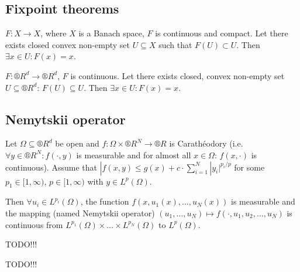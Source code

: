 \documentclass[12pt]{article}					%
\begin{document}
\subsection{Fixpoint theorems}
\begin{veta}
	$F: X \rightarrow X$, where $X$ is a Banach space, $F$ is continuous and compact. Let there exists closed convex non-empty set $U \subseteq X$ such that $F(U) \subset U$. Then $\exists x \in U: F(x) = x$.
\end{veta}

\begin{veta}
	$F: ®R^d \rightarrow ®R^d$, $F$ is continuous. Let there exists closed, convex non-empty set $U \subseteq ®R^d$: $F(U) \subseteq U$. Then $\exists x \in U: F(x) = x$.
\end{veta}

\subsection{Nemytskii operator}
\begin{veta}
	Let $Ω \subseteq ®R^d$ be open and $f: Ω \times ®R^N \rightarrow ®R$ is Carathéodory (i.e. $\forall y \in ®R^N: f(·, y)$ is measurable and for almost all $x \in Ω$: $f(x, ·)$ is continuous). Assume that $|f(x, y) ≤ g(x) + c·\sum_{i=1}^N |y_i|^{p_i / p}$ for some $p_1 \in [1, ∞)$, $p \in [1, ∞)$ with $y \in L^p(Ω)$.

	Then $\forall u_i \in L^{p_i}(Ω)$, the function $f(x, u_1(x), …, u_N(x))$ is measurable and the mapping (named Nemytskii operator) $(u_1, …, u_N) \mapsto f(·, u_1, u_2, …, u_N)$ is continuous from $L^{p_1}(Ω) \times … \times L^{p_N}(Ω)$ to $L^p(Ω)$.
\end{veta}


TODO!!!


TODO!!!
\end{document}
